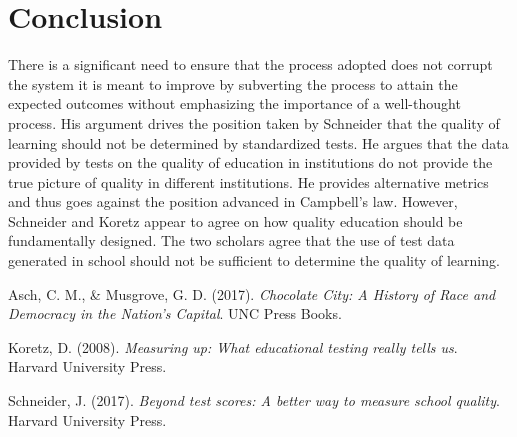 \documentclass[11pt]{article}
\begin{document}
\section{Conclusion}

There is a significant need to ensure that the process adopted does not corrupt the system it is meant to improve by subverting the process to attain the expected outcomes without emphasizing the importance of a well-thought process. His argument drives the position taken by Schneider that the quality of learning should not be determined by standardized tests. He argues that the data provided by tests on the quality of education in institutions do not provide the true picture of quality in different institutions. He provides alternative metrics and thus goes against the position advanced in Campbell's law. However, Schneider and Koretz appear to agree on how quality education should be fundamentally designed. The two scholars agree that the use of test data generated in school should not be sufficient to determine the quality of learning.

\begin{references}
\item Asch, C. M., \& Musgrove, G. D. (2017). \textit{Chocolate City: A History of Race and Democracy in the Nation's Capital}. UNC Press Books.
\item Koretz, D. (2008). \textit{Measuring up: What educational testing really tells us}. Harvard University Press.
\item Schneider, J. (2017). \textit{Beyond test scores: A better way to measure school quality}. Harvard University Press.
\end{references}
\end{document}
